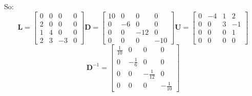 So:
\[
\textbf{L} = \begin{bmatrix}
0 & 0 & 0 & 0 \\
2 & 0 & 0 & 0 \\
1 & 4 & 0 & 0 \\
2 & 3 & -3 & 0
\end{bmatrix}
\textbf{D} = \begin{bmatrix}
10 & 0 & 0 & 0 \\
0 & -6 & 0 & 0 \\
0 & 0 & -12 & 0 \\
0 & 0 & 0 & -10
\end{bmatrix}
\textbf{U} = \begin{bmatrix}
0 & -4 & 1 & 2 \\
0 & 0 & 3 & -1 \\
0 & 0 & 0 & 1 \\
0 & 0 & 0 & 0
\end{bmatrix}
\]
\[
\textbf{D}^{-1} = \begin{bmatrix}
\frac{1}{10} & 0 & 0 & 0 \\
0 & - \frac{1}{6} & 0 & 0 \\
0 & 0 & - \frac{1}{12} & 0 \\
0 & 0 & 0 & - \frac{1}{10}
\end{bmatrix}
\]

\newpage

